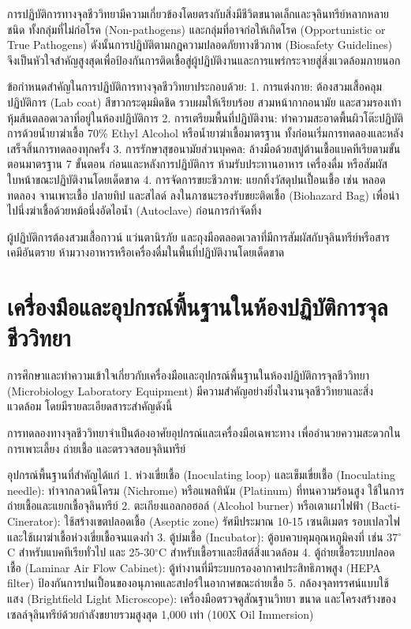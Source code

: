 การปฏิบัติการทางจุลชีววิทยามีความเกี่ยวข้องโดยตรงกับสิ่งมีชีวิตขนาดเล็กและจุลินทรีย์หลากหลายชนิด ทั้งกลุ่มที่ไม่ก่อโรค (Non-pathogens) และกลุ่มที่อาจก่อให้เกิดโรค (Opportunistic or True Pathogens) ดังนั้นการปฏิบัติตามกฎความปลอดภัยทางชีวภาพ (Biosafety Guidelines) จึงเป็นหัวใจสำคัญสูงสุดเพื่อป้องกันการติดเชื้อสู่ผู้ปฏิบัติงานและการแพร่กระจายสู่สิ่งแวดล้อมภายนอก

ข้อกำหนดสำคัญในการปฏิบัติการทางจุลชีววิทยาประกอบด้วย:
1. การแต่งกาย: ต้องสวมเสื้อคลุมปฏิบัติการ (Lab coat) สีขาวกระดุมมิดชิด รวบผมให้เรียบร้อย สวมหน้ากากอนามัย และสวมรองเท้าหุ้มส้นตลอดเวลาที่อยู่ในห้องปฏิบัติการ
2. การเตรียมพื้นที่ปฏิบัติงาน: ทำความสะอาดพื้นผิวโต๊ะปฏิบัติการด้วยน้ำยาฆ่าเชื้อ 70\% Ethyl Alcohol หรือน้ำยาฆ่าเชื้อมาตรฐาน ทั้งก่อนเริ่มการทดลองและหลังเสร็จสิ้นการทดลองทุกครั้ง
3. การรักษาสุขอนามัยส่วนบุคคล: ล้างมือด้วยสบู่ต้านเชื้อแบคทีเรียตามขั้นตอนมาตรฐาน 7 ขั้นตอน ก่อนและหลังการปฏิบัติการ ห้ามรับประทานอาหาร เครื่องดื่ม หรือสัมผัสใบหน้าขณะปฏิบัติงานโดยเด็ดขาด
4. การจัดการขยะชีวภาพ: แยกทิ้งวัสดุปนเปื้อนเชื้อ เช่น หลอดทดลอง จานเพาะเชื้อ ปลายทิป และสไลด์ ลงในภาชนะรองรับขยะติดเชื้อ (Biohazard Bag) เพื่อนำไปนึ่งฆ่าเชื้อด้วยหม้อนึ่งอัดไอน้ำ (Autoclave) ก่อนการกำจัดทิ้ง

\begin{safetybox}
ผู้ปฏิบัติการต้องสวมเสื้อกาวน์ แว่นตานิรภัย และถุงมือตลอดเวลาที่มีการสัมผัสกับจุลินทรีย์หรือสารเคมีอันตราย ห้ามวางอาหารหรือเครื่องดื่มในพื้นที่ปฏิบัติงานโดยเด็ดขาด
\end{safetybox}

\section{เครื่องมือและอุปกรณ์พื้นฐานในห้องปฏิบัติการจุลชีววิทยา}

การศึกษาและทำความเข้าใจเกี่ยวกับเครื่องมือและอุปกรณ์พื้นฐานในห้องปฏิบัติการจุลชีววิทยา (Microbiology Laboratory Equipment) มีความสำคัญอย่างยิ่งในงานจุลชีววิทยาและสิ่งแวดล้อม โดยมีรายละเอียดสาระสำคัญดังนี้

การทดลองทางจุลชีววิทยาจำเป็นต้องอาศัยอุปกรณ์และเครื่องมือเฉพาะทาง เพื่ออำนวยความสะดวกในการเพาะเลี้ยง ถ่ายเชื้อ และตรวจสอบจุลินทรีย์

อุปกรณ์พื้นฐานที่สำคัญได้แก่ 
1. ห่วงเขี่ยเชื้อ (Inoculating loop) และเข็มเขี่ยเชื้อ (Inoculating needle): ทำจากลวดนิโครม (Nichrome) หรือแพลทินัม (Platinum) ที่ทนความร้อนสูง ใช้ในการถ่ายเชื้อและแยกเชื้อจุลินทรีย์
2. ตะเกียงแอลกอฮอล์ (Alcohol burner) หรือเตาเผาไฟฟ้า (Bacti-Cinerator): ใช้สร้างเขตปลอดเชื้อ (Aseptic zone) รัศมีประมาณ 10-15 เซนติเมตร รอบเปลวไฟ และใช้เผาฆ่าเชื้อห่วงเขี่ยเชื้อจนแดงก่ำ
3. ตู้บ่มเชื้อ (Incubator): ตู้อบควบคุมอุณหภูมิคงที่ เช่น 37$^{\circ}$C สำหรับแบคทีเรียทั่วไป และ 25-30$^{\circ}$C สำหรับเชื้อราและยีสต์สิ่งแวดล้อม
4. ตู้ถ่ายเชื้อระบบปลอดเชื้อ (Laminar Air Flow Cabinet): ตู้ทำงานที่มีระบบกรองอากาศประสิทธิภาพสูง (HEPA filter) ป้องกันการปนเปื้อนของอนุภาคและสปอร์ในอากาศขณะถ่ายเชื้อ
5. กล้องจุลทรรศน์แบบใช้แสง (Brightfield Light Microscope): เครื่องมือตรวจดูสัณฐานวิทยา ขนาด และโครงสร้างของเซลล์จุลินทรีย์ด้วยกำลังขยายรวมสูงสุด 1,000 เท่า (100X Oil Immersion)

